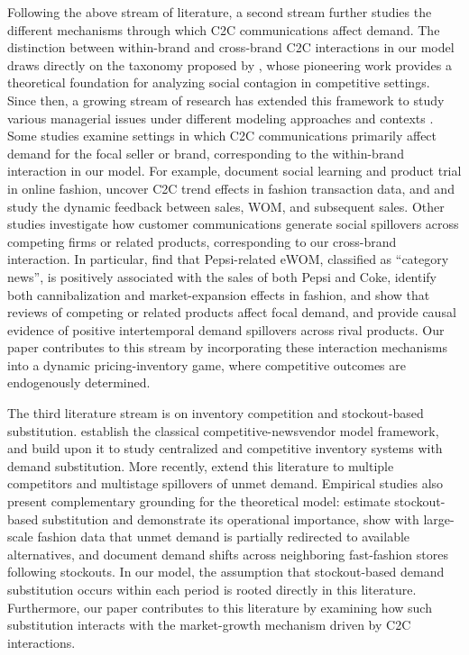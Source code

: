 \documentclass[nonblindrev,copyedit]{informs1}
\begin{document}
Following the above stream of literature, a second stream further studies the different mechanisms through which C2C communications affect demand. The distinction between within-brand and cross-brand C2C interactions in our model draws directly on the taxonomy proposed by \cite{libai2009}, whose pioneering work provides a theoretical foundation for analyzing social contagion in competitive settings. Since then, a growing stream of research has extended this framework to study various managerial issues under different modeling approaches and contexts \citep[see, e.g.,][]{ksv12, godes17, geng22}. Some studies examine settings in which C2C communications primarily affect demand for the focal seller or brand, corresponding to the within-brand interaction in our model. For example, \cite{lee2013} document social learning and product trial in online fashion, \cite{baardman2023} uncover C2C trend effects in fashion transaction data, and \cite{duan2008} and \cite{zhou2015} study the dynamic feedback between sales, WOM, and subsequent sales. Other studies investigate how customer communications generate social spillovers across competing firms or related products, corresponding to our cross-brand interaction. In particular, \cite{cola2020} find that Pepsi-related eWOM, classified as ``category news'', is positively associated with the sales of both Pepsi and Coke, \cite{shi2023} identify both cannibalization and market-expansion effects in fashion, \cite{cho2024} and \cite{kwark2021} show that reviews of competing or related products affect focal demand, and \cite{haviv2020} provide causal evidence of positive intertemporal demand spillovers across rival products. Our paper contributes to this stream by incorporating these interaction mechanisms into a dynamic pricing-inventory game, where competitive outcomes are endogenously determined.

The third literature stream is on inventory competition and stockout-based substitution. \cite{lm1997} establish the classical competitive-newsvendor model framework, and \cite{netessine2003} build upon it to study centralized and competitive inventory systems with demand substitution. More recently, \cite{bansal2022} extend this literature to multiple competitors and multistage spillovers of unmet demand. Empirical studies also present complementary grounding for the theoretical model: \cite{lee2016} estimate stockout-based substitution and demonstrate its operational importance, \cite{li2023} show with large-scale fashion data that unmet demand is partially redirected to available alternatives, and \cite{ergin2022} document demand shifts across neighboring fast-fashion stores following stockouts. In our model, the assumption that stockout-based demand substitution occurs within each period is rooted directly in this literature. Furthermore, our paper contributes to this literature by examining how such substitution interacts with the market-growth mechanism driven by C2C interactions.
\end{document}
